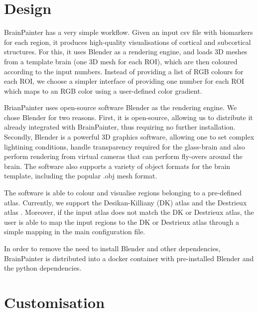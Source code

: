\documentclass{llncs}
\begin{document}
\FloatBarrier
\section{Design}
\label{design}



BrainPainter has a very simple workflow. Given an input csv file with biomarkers for each region, it produces high-quality visualisations of cortical and subcortical structures. For this, it uses Blender as a rendering engine, and loads 3D meshes from a template brain (one 3D mesh for each ROI), which are then coloured according to the input numbers. Instead of providing a list of RGB colours for each ROI, we choose a simpler interface of providing one number for each ROI which maps to an RGB color using a user-defined color gradient. 

BrianPainter uses open-source software Blender as the rendering engine. We chose Blender for two reasons. First, it is open-source, allowing us to distribute it already integrated with BrainPainter, thus requiring no further installation. Secondly, Blender is a powerful 3D graphics software, allowing one to set complex lightining conditions, handle transparency required for the glass-brain and also perform rendering from virtual cameras that can perform fly-overs around the brain. The software also supports a variety of object formats for the brain template, including the popular .obj mesh format.

The software is able to colour and visualise regions belonging to a pre-defined atlas. Currently, we support the Desikan-Killiany (DK) atlas \cite{desikan2006automated} and the Destrieux atlas \cite{destrieux2010automatic}. Moreover, if the input atlas does not match the DK or Destrieux atlas, the user is able to map the input regions to the DK or Destrieux atlas through a simple mapping in the main configuration file.  %

In order to remove the need to install Blender and other dependencies, BrainPainter is distributed into a docker container with pre-installed Blender and the python dependencies. 

\section{Customisation}
\label{customisation}
\end{document}
